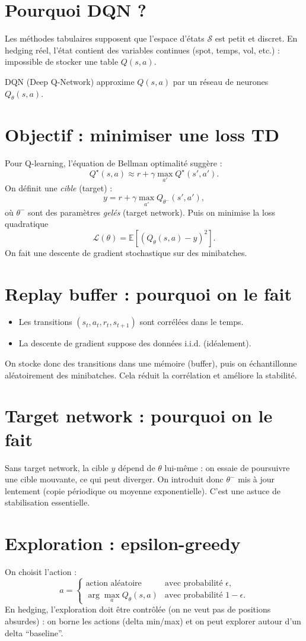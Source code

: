 \documentclass[11pt,a4paper]{report}
\newcommand{\E}{\mathbb{E}}
\newcommand{\1}{\mathbbm{1}}
\theoremstyle{definition}
\theoremstyle{plain}
\theoremstyle{remark}
\begin{document}
\section{Pourquoi DQN ?}
Les méthodes tabulaires supposent que l'espace d'états $\mathcal{S}$ est petit et discret.
En hedging réel, l'état contient des variables continues (spot, temps, vol, etc.) :
impossible de stocker une table $Q(s,a)$.

DQN (Deep Q-Network) approxime $Q(s,a)$ par un réseau de neurones $Q_\theta(s,a)$.

\section{Objectif : minimiser une loss TD}
Pour Q-learning, l'équation de Bellman optimalité suggère :
\[
Q^\star(s,a) \approx r + \gamma \max_{a'} Q^\star(s',a').
\]
On définit une \emph{cible} (target) :
\[
y = r + \gamma \max_{a'} Q_{\theta^-}(s',a'),
\]
où $\theta^-$ sont des paramètres \emph{gelés} (target network).
Puis on minimise la loss quadratique
\[
\mathcal{L}(\theta)=\E\left[(Q_\theta(s,a)-y)^2\right].
\]
On fait une descente de gradient stochastique sur des minibatches.

\section{Replay buffer : pourquoi on le fait}
\begin{itemize}
  \item Les transitions $(s_t,a_t,r_t,s_{t+1})$ sont corrélées dans le temps.
  \item La descente de gradient suppose des données i.i.d. (idéalement).
\end{itemize}
On stocke donc des transitions dans une mémoire (buffer), puis on échantillonne aléatoirement des minibatches.
Cela réduit la corrélation et améliore la stabilité.

\section{Target network : pourquoi on le fait}
Sans target network, la cible $y$ dépend de $\theta$ lui-même :
on essaie de poursuivre une cible mouvante, ce qui peut diverger.
On introduit donc $\theta^-$ mis à jour lentement (copie périodique ou moyenne exponentielle).
C'est une astuce de stabilisation essentielle.

\section{Exploration : epsilon-greedy}
On choisit l'action :
\[
a=
\begin{cases}
\text{action aléatoire} & \text{avec probabilité } \epsilon,\\
\arg\max_a Q_\theta(s,a) & \text{avec probabilité } 1-\epsilon.
\end{cases}
\]
En hedging, l'exploration doit être contrôlée (on ne veut pas de positions absurdes) :
on borne les actions (delta min/max) et on peut explorer autour d'un delta ``baseline''.
\end{document}
